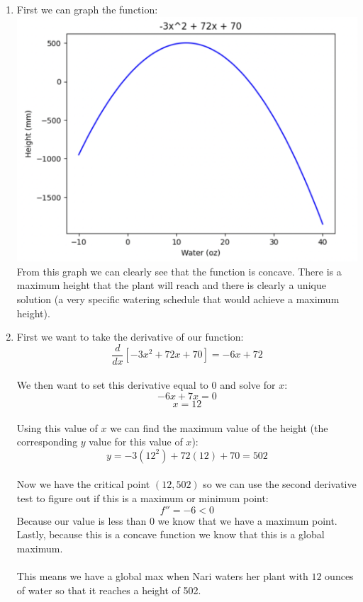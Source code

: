 \documentclass{harvardml}
\theoremstyle{definition}
\theoremstyle{plain}
\begin{document}
\begin{enumerate}
    \item First we can graph the function:\\
    \includegraphics[scale=0.5]{graph21.png}\\
    From this graph we can clearly see that the function is concave. There is a maximum height that the plant will reach and there is clearly a unique solution (a very specific watering schedule that would achieve a maximum height).\\
    \item
    First we want to take the derivative of our function:\\
    $$\frac{d}{dx}[-3x^2 + 72x + 70] = -6x + 72$$\\
    We then want to set this derivative equal to 0 and solve for $x$:\\
    $$-6x + 7x = 0$$
    $$x = 12$$\\
    Using this value of $x$ we can find the maximum value of the height (the corresponding $y$ value for this value of $x$):
    $$y = -3(12^2)+72(12)+70 = 502$$\\
    Now we have the critical point $(12, 502)$ so we can use the second derivative test to figure out if this is a maximum or minimum point:\\
    $$f'' = -6 < 0$$ Because our value is less than 0 we know that we have a maximum point.\\
    Lastly, because this is a concave function we know that this is a global maximum.\\
    \\
    This means we have a global max when Nari waters her plant with $12$ ounces of water so that it reaches a height of 502.

\end{enumerate}
\end{document}
